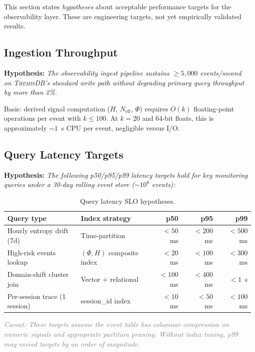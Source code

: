 \documentclass[11pt,a4paper]{article}
\newcommand{\themisdb}{\textsc{ThemisDB}}
\newcommand{\hypothesis}[1]{\textbf{Hypothesis:} \textit{#1}}
\newcommand{\caveat}[1]{\textcolor{gray}{\small\textit{Caveat: #1}}}
\theoremstyle{definition}
\begin{document}
This section states \emph{hypotheses} about acceptable performance
targets for the observability layer.
These are engineering targets, not yet empirically validated results.

\subsection{Ingestion Throughput}

\hypothesis{The observability ingest pipeline sustains
$\geq 5{,}000$ events/second on \themisdb{}'s standard write path
without degrading primary query throughput by more than 2\%.}

Basis: derived signal computation ($H$, $N_\text{eff}$, $\Phi$) requires
$O(k)$ floating-point operations per event with $k \leq 100$.
At $k=20$ and 64-bit floats, this is approximately $\sim 1$~\textmu s
CPU per event, negligible versus I/O.

\subsection{Query Latency Targets}

\hypothesis{The following p50/p95/p99 latency targets hold for
key monitoring queries under a 30-day rolling event store
($\sim 10^8$ events):}

\begin{table}[ht]
  \centering
  \caption{Query latency SLO hypotheses.}
  \label{tab:latency}
  \begin{tabular}{@{}llrrr@{}}
    \toprule
    Query type & Index strategy & p50 & p95 & p99 \\
    \midrule
    Hourly entropy drift (7d) & Time-partition & $<50$~ms & $<200$~ms & $<500$~ms \\
    High-risk events lookup & $(\Phi, H)$ composite index & $<20$~ms & $<100$~ms & $<300$~ms \\
    Domain-shift cluster join & Vector + relational & $<100$~ms & $<400$~ms & $<1$~s \\
    Per-session trace (1 session) & session\_id index & $<10$~ms & $<50$~ms & $<100$~ms \\
    \bottomrule
  \end{tabular}
\end{table}

\caveat{These targets assume the event table has columnar compression
on numeric signals and appropriate partition pruning.
Without index tuning, p99 may exceed targets by an order of magnitude.}
\end{document}
